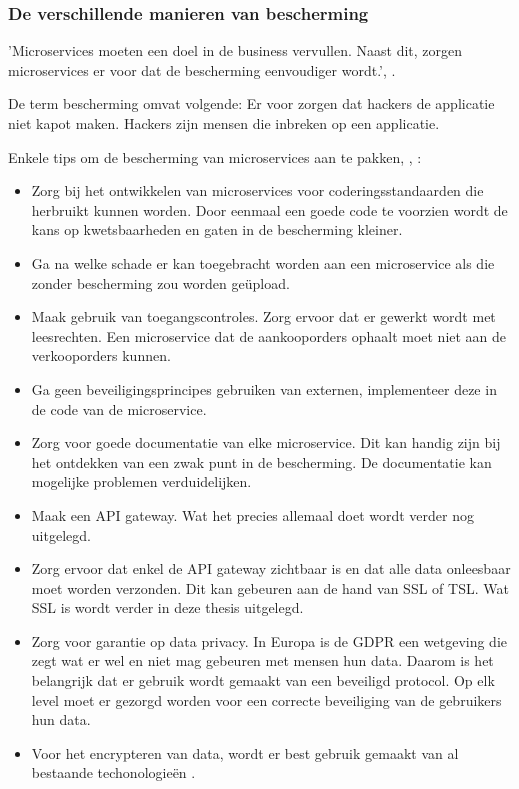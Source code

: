 \subsubsection{De verschillende manieren van bescherming}
'Microservices moeten een doel in de business vervullen. Naast dit, zorgen microservices er voor dat de bescherming eenvoudiger wordt.', \textcite{RDX2016}.

De term bescherming omvat volgende: Er voor zorgen dat hackers de applicatie niet kapot maken.
Hackers zijn mensen die inbreken op een applicatie.

Enkele tips om de bescherming van microservices aan te pakken, \textcite{Matteson2017}, \textcite{Silva2017}:
\begin{itemize}
	\item Zorg bij het ontwikkelen van microservices voor coderingsstandaarden die herbruikt kunnen worden. Door eenmaal een goede code te voorzien wordt de kans op kwetsbaarheden en gaten in de bescherming kleiner.
	\item Ga na  welke schade er kan toegebracht worden aan een microservice als die zonder bescherming zou worden geüpload.
	\item Maak gebruik van toegangscontroles. Zorg ervoor dat er gewerkt wordt met leesrechten. Een microservice dat de aankooporders ophaalt moet niet aan de verkooporders kunnen.
	\item Ga geen beveiligingsprincipes gebruiken van externen, implementeer deze in de code van de microservice.
	\item Zorg voor goede documentatie van elke microservice. Dit kan handig zijn bij het ontdekken van een zwak punt in de bescherming. De documentatie kan mogelijke problemen verduidelijken.
	\item Maak een API gateway. Wat het precies allemaal doet wordt verder nog uitgelegd.
	\item Zorg ervoor dat enkel de API gateway zichtbaar is en dat alle data onleesbaar moet worden verzonden. Dit kan gebeuren aan de hand van SSL of TSL. Wat SSL is wordt verder in deze thesis uitgelegd. 
	\item Zorg voor garantie op data privacy. In Europa is de GDPR een  wetgeving die zegt wat er  wel en niet mag gebeuren met mensen hun data. Daarom is het belangrijk dat er gebruik wordt gemaakt van een beveiligd protocol. Op elk level moet er gezorgd worden voor een correcte beveiliging van de gebruikers hun data. 
	\item Voor het encrypteren van data, wordt er best gebruik gemaakt van al bestaande techonologieën . 

\end{itemize}
